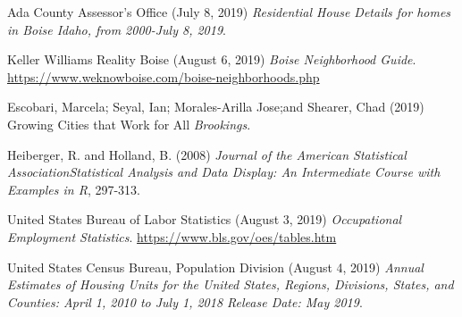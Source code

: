 \documentclass{article}
\begin{document}
\begin{thebibliography}{3}

Ada County Assessor's Office (July 8, 2019)
\newblock \textit{Residential House Details for homes in Boise Idaho, from 2000-July 8, 2019}.


Keller Williams Reality Boise (August 6, 2019)
\newblock \textit{Boise Neighborhood Guide}.
\newblock \url{https://www.weknowboise.com/boise-neighborhoods.php}




Escobari, Marcela; Seyal, Ian; Morales-Arilla Jose;and Shearer, Chad (2019)
\newblock Growing Cities that Work for All
\newblock \textit{Brookings}.

Heiberger, R. and Holland, B. (2008)
\newblock 
\newblock \textit{Journal of the American Statistical AssociationStatistical Analysis and Data Display: An Intermediate Course with Examples in R}, 297-313.


United States Bureau of Labor Statistics (August 3, 2019)
\newblock \textit{Occupational Employment Statistics}.
\newblock \url{https://www.bls.gov/oes/tables.htm}

United States Census Bureau, Population Division (August 4, 2019)
\newblock \textit{Annual Estimates of Housing Units for the United States, Regions, Divisions, States, and Counties: April 1, 2010 to July 1, 2018 Release Date: May 2019}.






\end{thebibliography}
\end{document}
